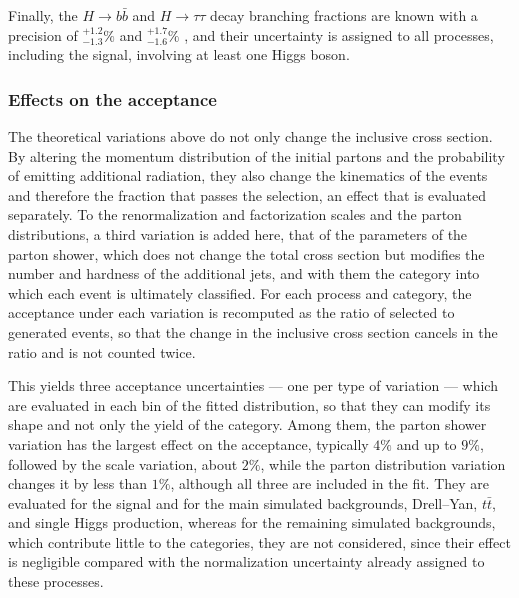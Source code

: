 

Finally, the $H\to b\bar{b}$ and $H\to\tau\tau$ decay branching fractions are known with a precision of $^{+1.2}_{-1.3}\%$ and $^{+1.7}_ {-1.6}\%$ \cite{deFlorian:2016spz}, and their uncertainty is assigned to all processes, including the signal, involving at least one Higgs boson.


\subsubsection{Effects on the acceptance} 
%
The theoretical variations above do not only change the inclusive cross section. By altering the momentum distribution of the initial partons and the probability of emitting additional radiation, they also change the kinematics of the events and therefore the fraction that passes the selection, an effect that is evaluated separately. To the renormalization and factorization scales and the parton distributions, a third variation is added here, that of the parameters of the parton shower, which does not change the total cross section but modifies the number and hardness of the additional jets, and with them the category into which each event is ultimately classified. For each process and category, the acceptance under each variation is recomputed as the ratio of selected to generated events, so that the change in the inclusive cross section cancels in the ratio and is not counted twice.

This yields three acceptance uncertainties — one per type of variation — which are evaluated in each bin of the fitted distribution, so that they can modify its shape and not only the yield of the category. Among them, the parton shower variation has the largest effect on the acceptance, typically $4\%$ and up to $9\%$, followed by the scale variation, about $2\%$, while the parton distribution variation changes it by less than $1\%$, although all three are included in the fit. They are evaluated for the signal and for the main simulated backgrounds, Drell--Yan, $t\bar{t}$, and single Higgs production, whereas for the remaining simulated backgrounds, which contribute little to the categories, they are not considered, since their effect is negligible compared with the normalization uncertainty already assigned to these processes.\medskip


